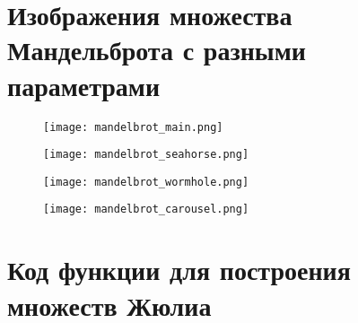 \documentclass[a4paper,12pt]{article}
\begin{document}
\clearpage

\hypertarget{sec:5}{}
\section{\textbf{Изображения множества Мандельброта с разными параметрами}}

\begin{figure}[h!]
    \centering
    \texttt{[image: mandelbrot\_main.png]}
    
    \vspace{0.5cm}
    
    \texttt{[image: mandelbrot\_seahorse.png]}
\end{figure}

\clearpage

\begin{figure}[h!]
    \centering
    \texttt{[image: mandelbrot\_wormhole.png]}
    
    \vspace{0.5cm}
    
    \texttt{[image: mandelbrot\_carousel.png]}
\end{figure}

\clearpage

\hypertarget{sec:6}{}
\section{\textbf{Код функции для построения множеств Жюлиа}}
\end{document}
